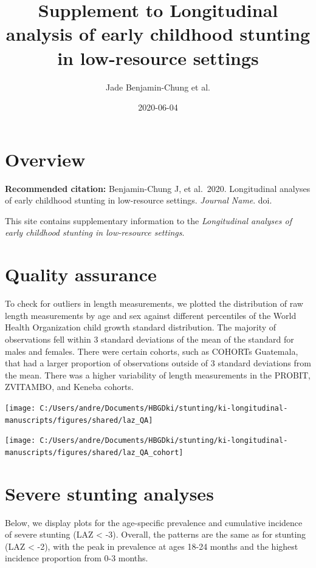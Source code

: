 \documentclass[
  9pt,
]{book}
\title{Supplement to Longitudinal analysis of early childhood stunting in low-resource settings}
\author{Jade Benjamin-Chung et al.}
\date{2020-06-04}
\begin{document}
\maketitle

{
\setcounter{tocdepth}{1}
\tableofcontents
}
\hypertarget{overview}{%
\chapter{Overview}\label{overview}}

\textbf{Recommended citation:} Benjamin-Chung J, et al.~2020. Longitudinal analyses of early childhood stunting in low-resource settings. \emph{Journal Name}. doi.

This site contains supplementary information to the \emph{Longitudinal analyses of early childhood stunting in low-resource settings}.

\hypertarget{QA}{%
\chapter{Quality assurance}\label{QA}}

\raggedright

To check for outliers in length measurements, we plotted the distribution of raw length measurements by age and sex against different percentiles of the World Health Organization child growth standard distribution. The majority of observations fell within 3 standard deviations of the mean of the standard for males and females. There were certain cohorts, such as COHORTs Guatemala, that had a larger proportion of observations outside of 3 standard deviations from the mean. There was a higher variability of length measurements in the PROBIT, ZVITAMBO, and Keneba cohorts.

\texttt{[image: C:/Users/andre/Documents/HBGDki/stunting/ki-longitudinal-manuscripts/figures/shared/laz\_QA]}

\texttt{[image: C:/Users/andre/Documents/HBGDki/stunting/ki-longitudinal-manuscripts/figures/shared/laz\_QA\_cohort]}

\hypertarget{severe-stunting}{%
\chapter{Severe stunting analyses}\label{severe-stunting}}

\raggedright

Below, we display plots for the age-specific prevalence and cumulative incidence of severe stunting (LAZ \textless{} -3). Overall, the patterns are the same as for stunting (LAZ \textless{} -2), with the peak in prevalence at ages 18-24 months and the highest incidence proportion from 0-3 months.
\end{document}
